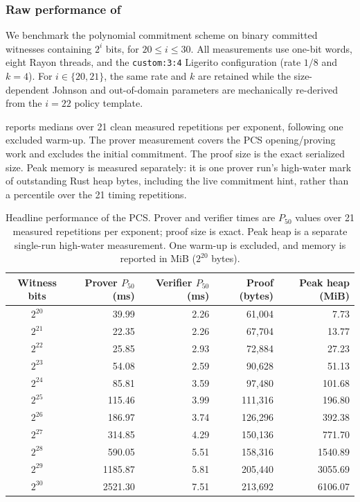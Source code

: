 \subsubsection{Raw performance of \ftwoz}

We benchmark the \ftwoz polynomial commitment scheme on binary committed
witnesses containing $2^i$ bits, for $20\leq i\leq 30$.  All measurements use
one-bit words, eight Rayon threads, and the \texttt{custom:3:4} Ligerito
configuration (rate $1/8$ and $k=4$).  For $i\in\{20,21\}$, the same rate and
$k$ are retained while the size-dependent Johnson and out-of-domain parameters
are mechanically re-derived from the $i=22$ policy template.

 reports medians over 21 clean measured repetitions
per exponent, following one excluded warm-up.  The prover measurement covers
the PCS opening/proving work and excludes the initial commitment.  The proof
size is the exact serialized size.  Peak memory is measured separately: it is
one prover run's high-water mark of outstanding Rust heap bytes, including the
live commitment hint, rather than a percentile over the 21 timing repetitions.

\begin{table}[H]
  \centering
  \small
  \setlength{\tabcolsep}{7pt}
  \caption{Headline performance of the \ftwoz PCS.  Prover and verifier times
    are $P_{50}$ values over 21 measured repetitions per exponent; proof size is
    exact.  Peak heap is a separate single-run high-water measurement.  One
    warm-up is excluded, and memory is reported in MiB ($2^{20}$ bytes).}
  \label{tab:f2z-pcs-headline}
  \begin{tabular}{@{}c r r r r@{}}
    \toprule
    Witness bits & Prover $P_{50}$ (ms) & Verifier $P_{50}$ (ms)
      & Proof (bytes) & Peak heap (MiB) \\
    \midrule
    $2^{20}$ &   39.99 & 2.26 &  61{,}004 &    7.73 \\
    $2^{21}$ &   22.35 & 2.26 &  67{,}704 &   13.77 \\
    $2^{22}$ &   25.85 & 2.93 &  72{,}884 &   27.23 \\
    $2^{23}$ &   54.08 & 2.59 &  90{,}628 &   51.13 \\
    $2^{24}$ &   85.81 & 3.59 &  97{,}480 &  101.68 \\
    $2^{25}$ &  115.46 & 3.99 & 111{,}316 &  196.80 \\
    $2^{26}$ &  186.97 & 3.74 & 126{,}296 &  392.38 \\
    $2^{27}$ &  314.85 & 4.29 & 150{,}136 &  771.70 \\
    $2^{28}$ &  590.05 & 5.51 & 158{,}316 & 1540.89 \\
    $2^{29}$ & 1185.87 & 5.81 & 205{,}440 & 3055.69 \\
    $2^{30}$ & 2521.30 & 7.51 & 213{,}692 & 6106.07 \\
    \bottomrule
  \end{tabular}
\end{table}

